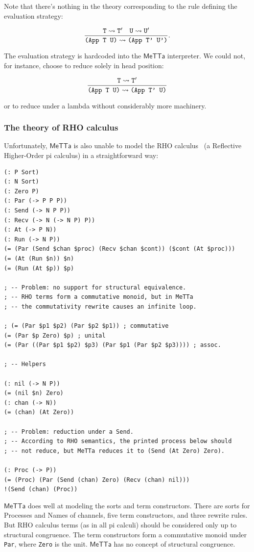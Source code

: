 \documentclass{article}
\begin{document}
Note that there's nothing in the theory corresponding to the rule defining the evaluation strategy:

\[ \frac{{\tt T} \leadsto {\tt T'} \quad {\tt U} \leadsto {\tt U'}}{\mbox{\tt (App T U)} \leadsto \mbox{\tt (App T' U')}}. \]

The evaluation strategy is hardcoded into the $\mathsf{MeTTa}$ interpreter.  We could not, for instance, choose to reduce solely in head position:

\[ \frac{{\tt T} \leadsto {\tt T'}}{\mbox{\tt (App T U)} \leadsto \mbox{\tt (App T' U)}} \]

or to reduce under a lambda without considerably more machinery.

\subsubsection{The theory of RHO calculus}

Unfortunately, $\mathsf{MeTTa}$ is also unable to model the RHO calculus~\cite{MeredithRadestock2005} (a Reflective Higher-Order pi calculus) in a straightforward way:

\begin{verbatim}
(: P Sort)
(: N Sort)
(: Zero P)
(: Par (-> P P P))
(: Send (-> N P P))
(: Recv (-> N (-> N P) P))
(: At (-> P N))
(: Run (-> N P))
(= (Par (Send $chan $proc) (Recv $chan $cont)) ($cont (At $proc)))
(= (At (Run $n)) $n)
(= (Run (At $p)) $p)

; -- Problem: no support for structural equivalence.
; -- RHO terms form a commutative monoid, but in MeTTa
; -- the commutativity rewrite causes an infinite loop.

; (= (Par $p1 $p2) (Par $p2 $p1)) ; commutative
(= (Par $p Zero) $p) ; unital
(= (Par ((Par $p1 $p2) $p3) (Par $p1 (Par $p2 $p3)))) ; assoc.

; -- Helpers

(: nil (-> N P))
(= (nil $n) Zero)
(: chan (-> N))
(= (chan) (At Zero))

; -- Problem: reduction under a Send.
; -- According to RHO semantics, the printed process below should
; -- not reduce, but MeTTa reduces it to (Send (At Zero) Zero).

(: Proc (-> P))
(= (Proc) (Par (Send (chan) Zero) (Recv (chan) nil)))
!(Send (chan) (Proc))
\end{verbatim}

\noindent $\mathsf{MeTTa}$ does well at modeling the sorts and term constructors.  There are sorts for Processes and Names of channels, five term constructors, and three rewrite rules.  But RHO calculus terms (as in all pi calculi) should be considered only up to structural congruence.  The term constructors form a commutative monoid under \verb+Par+, where \verb+Zero+ is the unit.  $\mathsf{MeTTa}$ has no concept of structural congruence.
\end{document}
